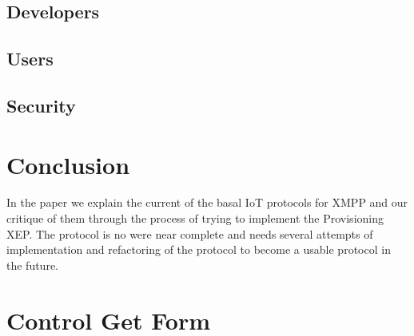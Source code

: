 \documentclass{sig-alternate}
\begin{document}
\subsection{Developers}



\subsection{Users}



\subsection{Security}



\section{Conclusion}

In the paper we explain the current of the basal IoT protocols for XMPP and
our critique of them through the process of trying to implement the
Provisioning XEP. The protocol is no were near complete and needs several
attempts of implementation and refactoring of the protocol to become a
usable protocol in the future.


\nocite{*}



\clearpage
\newpage

\onecolumn
\appendix
\section{Control Get Form}
\label{appendix_a}


\end{document}
